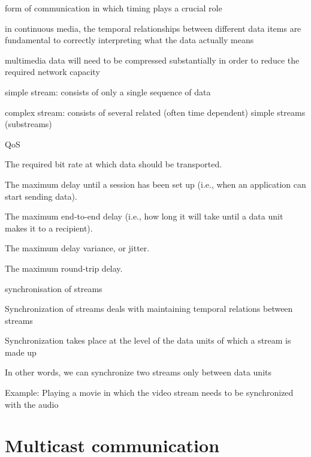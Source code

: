 \documentclass[ngerman,a4paper]{report}
\begin{document}
\begin{compactitem}
	\item form of communication in which timing plays a crucial role
	\item in continuous media, the temporal relationships between different data items are fundamental to correctly interpreting what the data actually means
	\item multimedia data will need to be compressed substantially in order to reduce the required network capacity
	\item simple stream: consists of only a single sequence of data
	\item complex stream: consists of several related (often time dependent) simple streams (substreams)
	\item QoS
		\begin{compactenum}
			\item The required bit rate at which data should be transported. 
			\item The maximum delay until a session has been set up (i.e., when an application can start sending data). 
			\item The maximum end-to-end delay (i.e., how long it will take until a data unit makes it to a recipient). 
			\item The maximum delay variance, or jitter. 
			\item The maximum round-trip delay.		
		\end{compactenum}

	\item synchronisation of streams
	\begin{compactitem}
		\item Synchronization of streams deals with maintaining temporal relations between streams
		\item Synchronization takes place at the level of the data units of which a stream is made up
		\item In other words, we can synchronize two streams only between data units
		\item Example: Playing a movie in which the video stream needs to be synchronized with the audio
	\end{compactitem}
	
\end{compactitem}


\section{Multicast communication}
\end{document}
